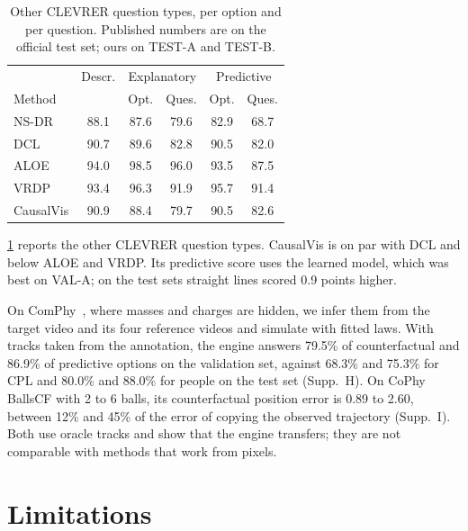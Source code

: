 \documentclass[10pt,twocolumn,letterpaper]{article}
\newcommand{\sys}{CausalVis}
\begin{document}
\begin{table}[tb]
\caption{Other CLEVRER question types, per option and per question. Published numbers are on the official test set; ours on TEST-A and TEST-B.}
\label{tab:qtypes}
\centering
\small
\setlength{\tabcolsep}{3.5pt}
\begin{tabular}{@{}lccccc@{}}
\toprule
& Descr. & \multicolumn{2}{c}{Explanatory} & \multicolumn{2}{c}{Predictive} \\
Method & & Opt. & Ques. & Opt. & Ques. \\
\midrule
NS-DR~\cite{yi2020clevrer} & 88.1 & 87.6 & 79.6 & 82.9 & 68.7 \\
DCL~\cite{chen2021dcl} & 90.7 & 89.6 & 82.8 & 90.5 & 82.0 \\
ALOE~\cite{ding2021aloe} & 94.0 & 98.5 & 96.0 & 93.5 & 87.5 \\
VRDP~\cite{ding2021vrdp} & 93.4 & 96.3 & 91.9 & 95.7 & 91.4 \\
\midrule
\sys{} & 90.9 & 88.4 & 79.7 & 90.5 & 82.6 \\
\bottomrule
\end{tabular}
\end{table}

\cref{tab:qtypes} reports the other CLEVRER question types.
\sys{} is on par with DCL and below ALOE and VRDP.
Its predictive score uses the learned model, which was best on VAL-A; on the test sets straight lines scored 0.9 points higher.

On ComPhy~\cite{chen2022comphy}, where masses and charges are hidden, we infer them from the target video and its four reference videos and simulate with fitted laws.
With tracks taken from the annotation, the engine answers 79.5\% of counterfactual and 86.9\% of predictive options on the validation set, against 68.3\% and 75.3\% for CPL and 80.0\% and 88.0\% for people on the test set (Supp.~H).
On CoPhy BallsCF with 2 to 6 balls, its counterfactual position error is 0.89 to 2.60, between 12\% and 45\% of the error of copying the observed trajectory (Supp.~I).
Both use oracle tracks and show that the engine transfers; they are not comparable with methods that work from pixels.

\section{Limitations}
\label{sec:limitations}
\end{document}
